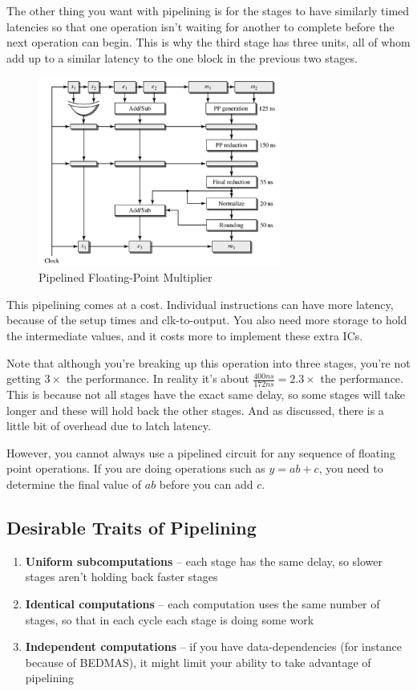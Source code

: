 \documentclass{article}
\begin{document}
The other thing you want with pipelining is for the stages to have similarly timed latencies so that one operation isn't waiting for another to complete before the next operation can begin. This is why the third stage has three units, all of whom add up to a similar latency to the one block in the previous two stages. 

\begin{figure}[ht!]
\centering
\includegraphics[width=80mm]{img/FloatingPointPipe.png}
\caption{Pipelined Floating-Point Multiplier}
\end{figure}

This pipelining comes at a cost. Individual instructions can have more latency, because of the setup times and clk-to-output. You also need more storage to hold the intermediate values, and it costs more to implement these extra ICs.

Note that although you're breaking up this operation into three stages, you're not getting $3\times$ the performance. In reality it's about $\frac{400ns}{172ns} = 2.3\times$ the performance. This is because not all stages have the exact same delay, so some stages will take longer and these will hold back the other stages. And as discussed, there is a little bit of overhead due to latch latency. 

However, you cannot always use a pipelined circuit for any sequence of floating point operations. If you are doing operations such as $y=ab+c$, you need to determine the final value of $ab$ before you can add $c$. 

\subsection{Desirable Traits of Pipelining}

\begin{enumerate}

\item \textbf{Uniform subcomputations} -- each stage has the same delay, so slower stages aren't holding back faster stages

\item \textbf{Identical computations} -- each computation uses the same number of stages, so that in each cycle each stage is doing some work

\item \textbf{Independent computations} -- if you have data-dependencies (for instance because of BEDMAS), it might limit your ability to take advantage of pipelining

\end{enumerate}
\end{document}
